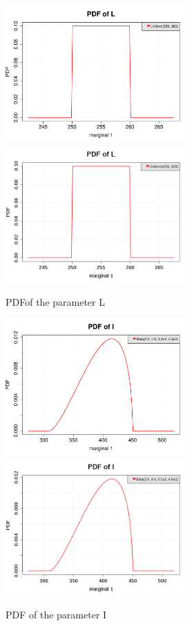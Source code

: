 \documentclass[11pt]{article}
\begin{document}
\begin{figure}[Hhbtp]
  \begin{minipage}{9.8cm}
    \begin{center}
      \ifpdf
      \includegraphics[width=7cm]{distributionL_pdf.pdf}
      \else
      \includegraphics[width=7cm]{distributionL_pdf.png}
      \fi
      \caption{PDFof the parameter L}
      \label{pdfL}
    \end{center}
  \end{minipage}
  \hfill
  \begin{minipage}{9.8cm}
    \begin{center}
      \ifpdf
      \includegraphics[width=7cm]{distributionI_pdf.pdf}
      \else
      \includegraphics[width=7cm]{distributionI_pdf.png}
      \fi
      \caption{PDF of the parameter I}
      \label{pdfI}
    \end{center}
  \end{minipage}
\end{figure}
\end{document}
